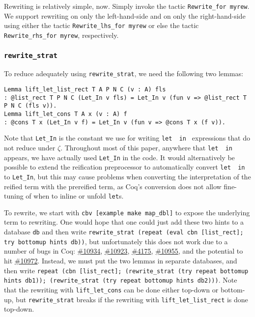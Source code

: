 \documentclass[a4paper,USenglish,cleveref,autoref,thm-restate]{lipics-v2021}
\makeatletter
\newcommand{\coqbug}[1]{\href{https://github.com/coq/coq/issues/#1}{\##1}}
\newcommand{\letin}[1][{\ensuremath{\cdots}}{\ensuremath{\cdots}}]{%
  \texttt{let }\@firstoftwo#1\texttt{ in }\@secondoftwo#1
}
\makeatother
\begin{document}
\begin{minipage}[t][1cm]{\textwidth}
Rewriting is relatively simple, now.
Simply invoke the tactic \texttt{Rewrite_for myrew}.
We support rewriting on only the left-hand-side and on only the right-hand-side using either the tactic \texttt{Rewrite_lhs_for myrew} or else the tactic \texttt{Rewrite_rhs_for myrew}, respectively.

\subsubsection{\texorpdfstring{\texttt{rewrite\_strat}}{rewrite\_strat}}

To reduce adequately using \texttt{rewrite\_strat}, we need the following two lemmas:
\begin{verbatim}
Lemma lift_let_list_rect T A P N C (v : A) fls
: @list_rect T P N C (Let_In v fls) = Let_In v (fun v => @list_rect T P N C (fls v)).
Lemma lift_let_cons T A x (v : A) f
: @cons T x (Let_In v f) = Let_In v (fun v => @cons T x (f v)).
\end{verbatim}

Note that \texttt{Let_In} is the constant we use for writing \letin{} expressions that do not reduce under $\zeta$.
Throughout most of this paper, anywhere that \letin{} appears, we have actually used \texttt{Let_In} in the code.
It would alternatively be possible to extend the reification preprocessor to automatically convert \letin{} to \texttt{Let_In}, but this may cause problems when converting the interpretation of the reified term with the prereified term, as Coq's conversion does not allow fine-tuning of when to inline or unfold \texttt{let}s.

To rewrite, we start with \texttt{cbv [example make map_dbl]} to expose the underlying term to rewriting.
One would hope that one could just add these two hints to a database \texttt{db} and then write \texttt{rewrite\_strat (repeat (eval cbn [list\_rect]; try bottomup hints db))}, but unfortunately this does not work due to a number of bugs in Coq: \coqbug{10934}, \coqbug{10923}, \coqbug{4175}, \coqbug{10955}, and the potential to hit \coqbug{10972}.
Instead, we must put the two lemmas in separate databases, and then write \texttt{repeat (cbn [list\_rect]; (rewrite\_strat (try repeat bottomup hints db1)); (rewrite\_strat (try repeat bottomup hints db2)))}.
Note that the rewriting with \texttt{lift_let_cons} can be done either top-down or bottom-up, but \texttt{rewrite\_strat} breaks if the rewriting with \texttt{lift_let_list_rect} is done top-down.


\end{minipage}
\end{document}

